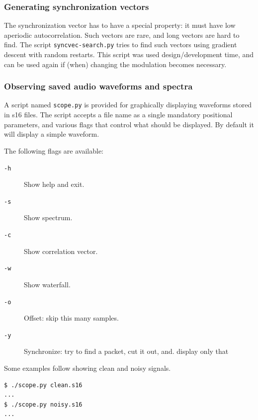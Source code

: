 \documentclass[a4paper]{article}
\begin{document}
\subsubsection{Generating synchronization vectors}

The synchronization vector has to have a special property: it must have 
low aperiodic autocorrelation. Such vectors are rare, and long vectors 
are hard to find. The script \texttt{syncvec-search.py} tries to find 
such vectors using gradient descent with random restarts. This script 
was used design/development time, and can be used again if (when) 
changing the modulation becomes necessary.

\subsubsection{Observing saved audio waveforms and spectra}

A script named \texttt{scope.py} is provided for graphically displaying 
waveforms stored in s16 files. The script accepts a file name as a 
single mandatory positional parameters, and various flags that control 
what should be displayed. By default it will display a simple waveform.

The following flags are available:

\begin{description}
\item[\texttt{-h}] Show help and exit.
\item[\texttt{-s}] Show spectrum.
\item[\texttt{-c}] Show correlation vector.
\item[\texttt{-w}] Show waterfall.
\item[\texttt{-o}] Offset: skip this many samples.
\item[\texttt{-y}] Synchronize: try to find a packet, cut it out, and.
  display only that
\end{description}

Some examples follow showing clean and noisy signals.

\begin{lstlisting}
$ ./scope.py clean.s16
...
$ ./scope.py noisy.s16
...
\end{lstlisting}
\end{document}
